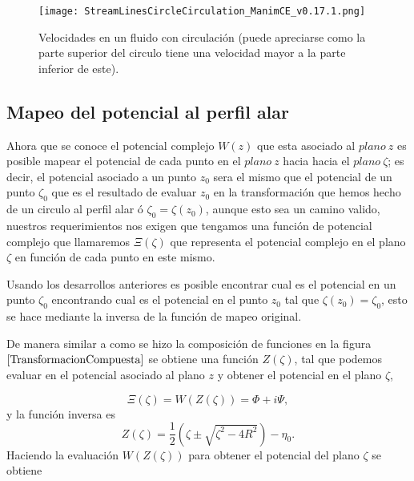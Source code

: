 \documentclass[12pt]{article}
\begin{document}
			\begin{figure}[H]
				\begin{small}
					\begin{center}
						\texttt{[image: StreamLinesCircleCirculation\_ManimCE\_v0.17.1.png]}
					\end{center}
					\caption{Velocidades en un fluido con circulación (puede apreciarse como la parte superior del circulo tiene una velocidad mayor a la parte inferior de este).}
				\end{small}
			\end{figure}
			
			\subsection{Mapeo del potencial al perfil alar}
			\noindent Ahora que se conoce el potencial complejo $W(z)$ que esta asociado al $plano \: z$ es posible mapear el potencial de cada punto en el $plano \: z$ hacia hacia el $plano \: \zeta$; es decir, el potencial asociado a un punto $z_0$ sera el mismo que el potencial de un punto  $\zeta_0$ que es el resultado de evaluar $z_0$ en la transformación que hemos hecho de un circulo al perfil alar ó $\zeta_0=\zeta(z_0)$, aunque esto sea un camino valido, nuestros requerimientos nos exigen que tengamos una función de potencial complejo que llamaremos $\Xi(\zeta)$ que representa el potencial complejo en el plano $\zeta$ en función de cada punto en este mismo.
			
			\noindent Usando los desarrollos anteriores es posible encontrar cual es el potencial en un punto $\zeta_0$ encontrando cual es el potencial en el punto $z_0$ tal que $\zeta(z_0) = \zeta_0$, esto se hace mediante la inversa de la función de mapeo original.
			
			
			De manera similar a como se hizo la composición de funciones en la figura $\ref*{TransformacionCompuesta}$ se obtiene una función $Z(\zeta)$, tal que podemos evaluar en el potencial asociado al plano $z$ y obtener el potencial en el plano $\zeta$,

			\begin{equation*}
				\Xi(\zeta)= W(Z(\zeta))	= \Phi +i \Psi,			
			\end{equation*}
			y la función inversa es
			\begin{equation*}
				Z(\zeta)= \frac{1}{2}\left(\zeta \pm  \sqrt{\zeta^2 -4R^2} \right) - \eta_0 . 
			\end{equation*}
			Haciendo la evaluación $W(Z(\zeta))$ para obtener el potencial del plano $\zeta$ se obtiene
			
\end{document}
